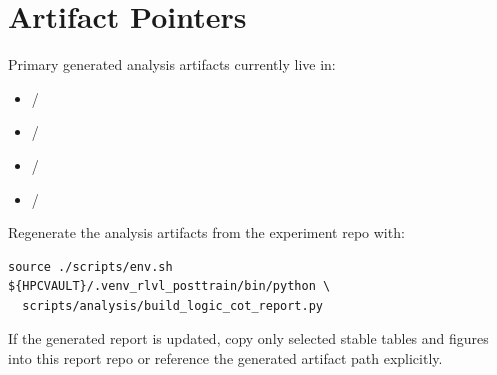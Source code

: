 \section{Artifact Pointers}

Primary generated analysis artifacts currently live in:

\begin{itemize}
  \item \repo{}/
  \item \repo{}/
  \item \repo{}/
  \item \repo{}/
\end{itemize}

Regenerate the analysis artifacts from the experiment repo with:

\begin{verbatim}
source ./scripts/env.sh
${HPCVAULT}/.venv_rlvl_posttrain/bin/python \
  scripts/analysis/build_logic_cot_report.py
\end{verbatim}

If the generated report is updated, copy only selected stable tables and figures
into this report repo or reference the generated artifact path explicitly.

